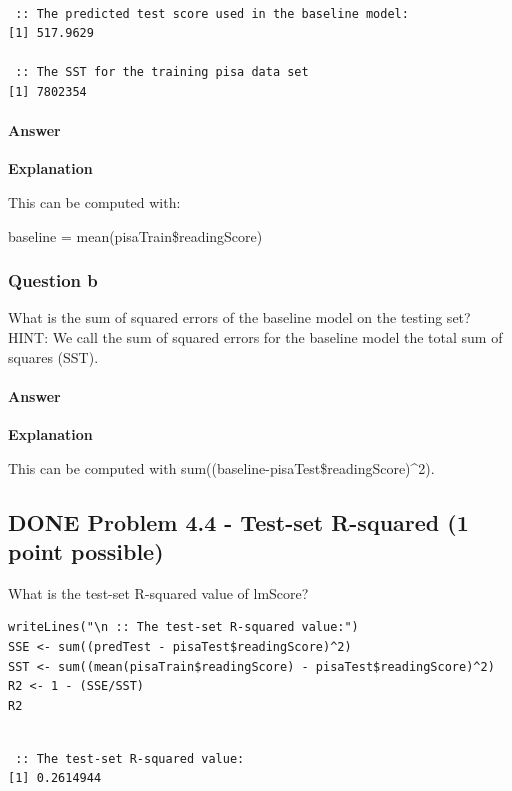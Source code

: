 \documentclass[letterpaper, 9pt, onecolumn, twoside, technote, final]{IEEEtran}
\begin{document}
\begin{verbatim}

 :: The predicted test score used in the baseline model:
[1] 517.9629

 :: The SST for the training pisa data set
[1] 7802354
\end{verbatim}

\paragraph{Answer}
\label{sec-2-15-1-1}

\textbf{Explanation}

This can be computed with:

baseline = mean(pisaTrain\$readingScore)

\subsubsection{Question b}
\label{sec-2-15-2}

What is the sum of squared errors of the baseline model on the testing
set? HINT: We call the sum of squared errors for the baseline model
the total sum of squares (SST).

\paragraph{Answer}
\label{sec-2-15-2-1}

\textbf{Explanation}

This can be computed with sum((baseline-pisaTest\$readingScore)\^{}2).

\subsection{{\bfseries\sffamily DONE} Problem 4.4 - Test-set R-squared (1 point possible)}
\label{sec-2-16}
What is the test-set R-squared value of lmScore?

\begin{verbatim}
writeLines("\n :: The test-set R-squared value:")
SSE <- sum((predTest - pisaTest$readingScore)^2)
SST <- sum((mean(pisaTrain$readingScore) - pisaTest$readingScore)^2)
R2 <- 1 - (SSE/SST)
R2
\end{verbatim}

\begin{verbatim}

 :: The test-set R-squared value:
[1] 0.2614944
\end{verbatim}
\end{document}
